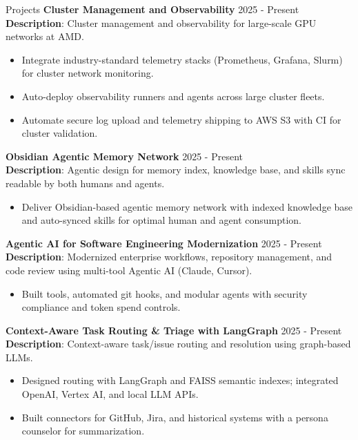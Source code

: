 \documentclass{resume} %
\begin{document}
\begin{rSection}{Projects}
{\bf Cluster Management and Observability} \hfill {2025 - Present}\\
\textbf{Description}: Cluster management and observability for large-scale GPU networks at AMD.
\begin{itemize}
    \item Integrate industry-standard telemetry stacks (Prometheus, Grafana, Slurm) for cluster network monitoring.
    \item Auto-deploy observability runners and agents across large cluster fleets.
    \item Automate secure log upload and telemetry shipping to AWS S3 with CI for cluster validation.
\end{itemize}

{\bf Obsidian Agentic Memory Network} \hfill {2025 - Present}\\
\textbf{Description}: Agentic design for memory index, knowledge base, and skills sync readable by both humans and agents.
\begin{itemize}
    \item Deliver Obsidian-based agentic memory network with indexed knowledge base and auto-synced skills for optimal human and agent consumption.
\end{itemize}

{\bf Agentic AI for Software Engineering Modernization} \hfill {2025 - Present}\\
\textbf{Description}: Modernized enterprise workflows, repository management, and code review using multi-tool Agentic AI (Claude, Cursor).
\begin{itemize}
    \item Built tools, automated git hooks, and modular agents with security compliance and token spend controls.
\end{itemize}

{\bf Context-Aware Task Routing \& Triage with LangGraph} \hfill {2025 - Present}\\
\textbf{Description}: Context-aware task/issue routing and resolution using graph-based LLMs.
\begin{itemize}
    \item Designed routing with LangGraph and FAISS semantic indexes; integrated OpenAI, Vertex AI, and local LLM APIs.
    \item Built connectors for GitHub, Jira, and historical systems with a persona counselor for summarization.
\end{itemize}


\end{rSection}
\end{document}
